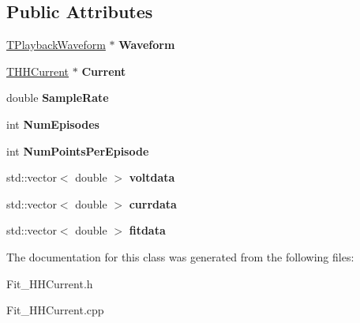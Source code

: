 \subsection*{Public Attributes}
\begin{DoxyCompactItemize}
\item 
\hypertarget{class_t_h_h_current_model_a89f3e258927c21ad4263cec1d42c3893}{\hyperlink{class_t_playback_waveform}{T\+Playback\+Waveform} $\ast$ {\bfseries Waveform}}\label{class_t_h_h_current_model_a89f3e258927c21ad4263cec1d42c3893}

\item 
\hypertarget{class_t_h_h_current_model_a3d3076f6fca670df64cf98c38ae21800}{\hyperlink{class_t_h_h_current}{T\+H\+H\+Current} $\ast$ {\bfseries Current}}\label{class_t_h_h_current_model_a3d3076f6fca670df64cf98c38ae21800}

\item 
\hypertarget{class_t_h_h_current_model_a08b581933f4643976cedbcca848d3f77}{double {\bfseries Sample\+Rate}}\label{class_t_h_h_current_model_a08b581933f4643976cedbcca848d3f77}

\item 
\hypertarget{class_t_h_h_current_model_ac0b430e2c3c82b5e0c9fdaab4390c2b4}{int {\bfseries Num\+Episodes}}\label{class_t_h_h_current_model_ac0b430e2c3c82b5e0c9fdaab4390c2b4}

\item 
\hypertarget{class_t_h_h_current_model_af91a84197199459314301d81926ea5cd}{int {\bfseries Num\+Points\+Per\+Episode}}\label{class_t_h_h_current_model_af91a84197199459314301d81926ea5cd}

\item 
\hypertarget{class_t_h_h_current_model_af97d27e7a3736d5850046fddebd6e934}{std\+::vector$<$ double $>$ {\bfseries voltdata}}\label{class_t_h_h_current_model_af97d27e7a3736d5850046fddebd6e934}

\item 
\hypertarget{class_t_h_h_current_model_a99fdc6e25ff271ff59aee23a82b51739}{std\+::vector$<$ double $>$ {\bfseries currdata}}\label{class_t_h_h_current_model_a99fdc6e25ff271ff59aee23a82b51739}

\item 
\hypertarget{class_t_h_h_current_model_a235d0be2b3ccf7e3d62d8b8335aba535}{std\+::vector$<$ double $>$ {\bfseries fitdata}}\label{class_t_h_h_current_model_a235d0be2b3ccf7e3d62d8b8335aba535}

\end{DoxyCompactItemize}


The documentation for this class was generated from the following files\+:\begin{DoxyCompactItemize}
\item 
Fit\+\_\+\+H\+H\+Current.\+h\item 
Fit\+\_\+\+H\+H\+Current.\+cpp\end{DoxyCompactItemize}
